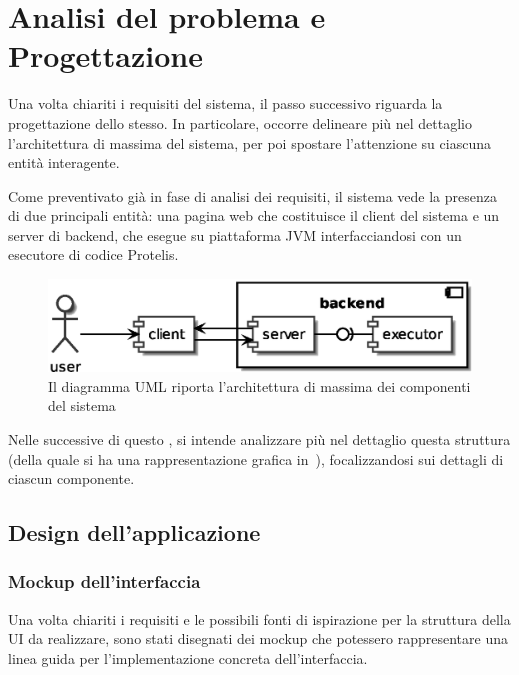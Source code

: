 \chapter{Analisi del problema e Progettazione}\label{ch:project}
  Una volta chiariti i requisiti del sistema, il passo successivo riguarda la progettazione dello stesso.
  In particolare, occorre delineare più nel dettaglio l'architettura di massima del sistema, per poi spostare l'attenzione su ciascuna entità interagente.

  Come preventivato già in fase di analisi dei requisiti, il sistema vede la presenza di due principali entità:
  una pagina web che costituisce il client del sistema e un server di backend, che esegue su piattaforma JVM interfacciandosi con un esecutore di codice Protelis.

  \begin{figure}[htbp]
    \centering
    \includegraphics[width=.8\textwidth]{res/uml/architecture-design.eps}%
    \caption{Il diagramma UML riporta l'architettura di massima dei componenti del sistema}%
    \label{fig:architecture-design}
  \end{figure}

  Nelle  successive di questo , si intende analizzare più nel dettaglio questa struttura (della quale si ha una rappresentazione grafica in~),
  focalizzandosi sui dettagli di ciascun componente.

  \section{Design dell'applicazione}\label{sec:client-design}

    \subsection{Mockup dell'interfaccia}\label{subsec:mockup}
      Una volta chiariti i requisiti e le possibili fonti di ispirazione per la struttura della UI da realizzare, sono stati disegnati dei mockup che potessero rappresentare una linea guida
      per l'implementazione concreta dell'interfaccia.

